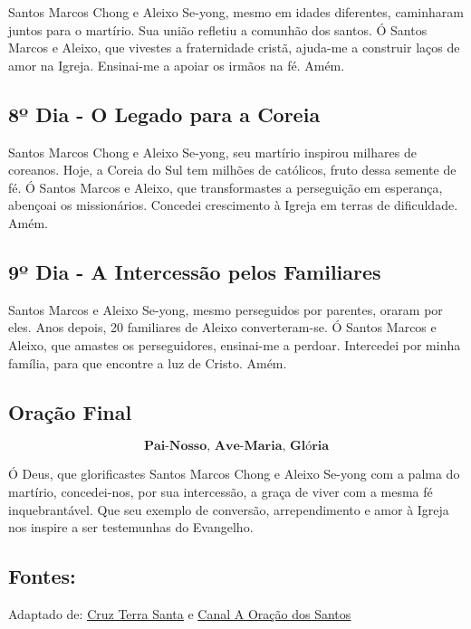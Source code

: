 \documentclass[a4paper,14pt]{extarticle} \usepackage[utf8]{inputenc}
\begin{document}
Santos Marcos Chong e Aleixo Se-yong, mesmo em idades diferentes, caminharam juntos para o martírio. Sua união refletiu a comunhão dos santos.
Ó Santos Marcos e Aleixo, que vivestes a fraternidade cristã, ajuda-me a construir laços de amor na Igreja. Ensinai-me a apoiar os irmãos na fé. Amém.

\underline{}


\subsection{8º Dia - O Legado para a Coreia}

\underline{}

Santos Marcos Chong e Aleixo Se-yong, seu martírio inspirou milhares de coreanos. Hoje, a Coreia do Sul tem milhões de católicos, fruto dessa semente de fé.
Ó Santos Marcos e Aleixo, que transformastes a perseguição em esperança, abençoai os missionários. Concedei crescimento à Igreja em terras de dificuldade. Amém.

\underline{}


\subsection{9º Dia - A Intercessão pelos Familiares}

\underline{}

Santos Marcos e Aleixo Se-yong, mesmo perseguidos por parentes, oraram por eles. Anos depois, 20 familiares de Aleixo converteram-se.
Ó Santos Marcos e Aleixo, que amastes os perseguidores, ensinai-me a perdoar. Intercedei por minha família, para que encontre a luz de Cristo. Amém.

\underline{}

\subsection{Oração Final}\label{sub:final} %

\[\textbf{Pai-Nosso, Ave-Maria, Glória}\]

Ó Deus, que glorificastes Santos Marcos Chong e Aleixo Se-yong com a palma do martírio, concedei-nos, por sua intercessão, a graça de viver com a mesma fé inquebrantável. Que seu exemplo de conversão, arrependimento e amor à Igreja nos inspire a ser testemunhas do Evangelho.


\vfill

\begin{center}
\subsection*{Fontes:}
Adaptado de: {\color{blue} \underline{\href{https://cruzterrasanta.com.br/historia-de-santos-marcos-chong-ui-bae-e-aleixo-se-yong/661/102/}{Cruz Terra Santa}}} e {\color{blue} \underline{\href{https://www.youtube.com/watch?v=BlnjejCeG9Q&list=PLN7jQwkJvdQpUGspEmJEwsncnNP89slhH}{Canal A Oração dos Santos}}}
\end{center}
\end{document}

